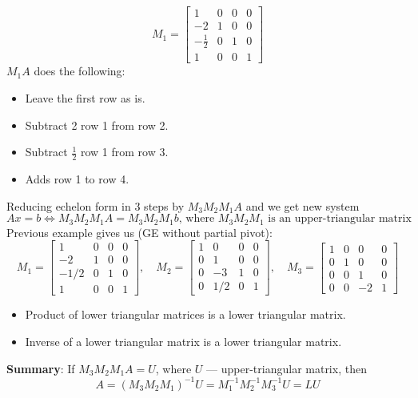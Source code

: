 \begin{example}
    \[M_1 = \begin{bmatrix}
        1 & 0 & 0 & 0\\
        -2 & 1 & 0 & 0\\
        -\frac{1}{2} & 0 & 1 & 0\\
        1 & 0 & 0 & 1
    \end{bmatrix}\]
    $M_1 A$ does the following:
    \begin{itemize}
        \item {
            Leave the first row as is.
        }
        \item {
            Subtract 2 row 1 from row 2.
        }
        \item {
            Subtract $\frac{1}{2}$ row 1 from row 3.
        }
        \item {
            Adds row 1 to row 4.
        }
    \end{itemize}
    Reducing echelon form in 3 steps by $M_3 M_2 M_1 A$
    and we get new system
    \[ Ax = b \Longleftrightarrow M_3 M_2 M_1 A = M_3 M_2 M_1 b
    \text{, where $M_3 M_2 M_1$ is an upper-triangular matrix} \]
    Previous example gives us (GE without partial pivot):
    \[
        M_1 = \begin{bmatrix}
            1 & 0 & 0 & 0\\
            -2 & 1 & 0 & 0\\
            -1/2 & 0 & 1 & 0\\
            1 & 0 & 0 & 1
        \end{bmatrix},\quad
        M_2 = \begin{bmatrix}
            1 & 0 & 0 & 0\\
            0 & 1 & 0 & 0\\
            0 & -3 & 1 & 0\\
            0 & 1/2 & 0 & 1
        \end{bmatrix},\quad
        M_3 = \begin{bmatrix}
            1 & 0 & 0 & 0\\
            0 & 1 & 0 & 0\\
            0 & 0 & 1 & 0\\
            0 & 0 & -2 & 1
        \end{bmatrix}
    \]
\end{example}
\begin{remark}
    \mbox{}
    \begin{itemize}
        \item {
            Product of lower triangular matrices is a lower triangular matrix.
        }
        \item {
            Inverse of a lower triangular matrix is a lower triangular matrix.
        }
    \end{itemize}
\end{remark}
\textbf{Summary}:
If $M_3 M_2 M_1 A = U$, where $U$ --- upper-triangular matrix, then
\[ A = (M_3 M_2 M_1)^{-1} U = M_1^{-1} M_2^{-1} M_3^{-1} U = LU \]


